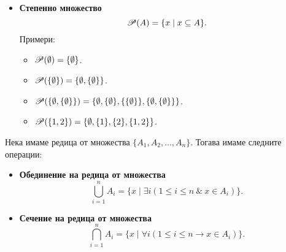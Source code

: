 \begin{itemize}
  \item
    {\bf Степенно множество}
    \[\mathscr{P}(A) = \{x\mid x\subseteq A\}.\]
    Примери:
    \begin{itemize}
    \item 
      $\mathscr{P}(\emptyset) = \{\emptyset\}$.
    \item
      $\mathscr{P}(\{\emptyset\}) = \{\emptyset,\{\emptyset\}\}$.
    \item
      $\mathscr{P}(\{\emptyset,\{\emptyset\}\}) = \{\emptyset,\{\emptyset\},\{\{\emptyset\}\},\{\emptyset,\{\emptyset\}\}\}$.
    \item
      $\mathscr{P}(\{1,2\}) = \{\emptyset,\{1\},\{2\},\{1,2\}\}$.
    \end{itemize}
  \end{itemize}
  Нека имаме редица от множества $\{A_1,A_2,\dots,A_n\}$.
  Тогава имаме следните операции:
  \begin{itemize}
  \item
    {\bf Обединение на редица от множества}
    \[\bigcup^{n}_{i=1} A_i = \{x \mid \exists i (1\leq i\leq n\ \&\ x\in A_i)\}.\]
  \item
    {\bf Сечение на редица от множества}
    \[\bigcap^{n}_{i=1} A_i = \{x \mid \forall i (1\leq i\leq n \rightarrow x\in A_i)\}.\]
  \end{itemize}


